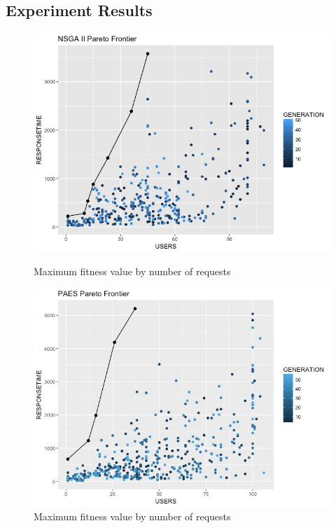 \documentclass{report}
\begin{document}
\subsection{Experiment Results}

\begin{figure}[h]
\begin{minipage}{.5\textwidth}
\centering
\includegraphics[width=1\textwidth]{./images/nsga2paretofrontier2.png}
\caption{Maximum fitness value by number of requests}
\label{fig:paretofrontier2}
\end{minipage}
\begin{minipage}{.5\textwidth}
\centering
\includegraphics[width=1\textwidth]{./images/paesfrontier2.jpeg}
\caption{Maximum fitness value by number of requests}
\label{fig:paretofrontier2}
\end{minipage}
\end{figure}
\end{document}
